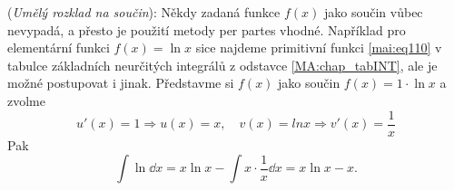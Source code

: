 \begin{mdframed}[style=mdexam]
  \begin{example}\label{mai:exam109}
    (\emph{Umělý rozklad na součin}): Někdy zadaná funkce \(f(x)\) jako součin vůbec nevypadá, a
    přesto je použití metody per partes vhodné. Například pro elementární funkci \(f(x) = \ln x\)
    sice najdeme primitivní funkci \ref{mai:eq110} v tabulce základních neurčitých integrálů z
    odstavce \ref{MA:chap_tabINT}, ale je možné postupovat i jinak. Představme si \(f(x)\) jako
    součin \(f(x) = 1\cdot\ln x\) a zvolme \[u'(x) = 1 ⇒ u(x) = x, \quad v(x) = lnx ⇒ v'(x) =
    \frac{1}{x}\] Pak 
    \begin{equation*}
      \int\ln\dd{x} = x\ln x - \int x\cdot\frac{1}{x}\dd{x}= x\ln x - x.
    \end{equation*}
  \end{example}
\end{mdframed}